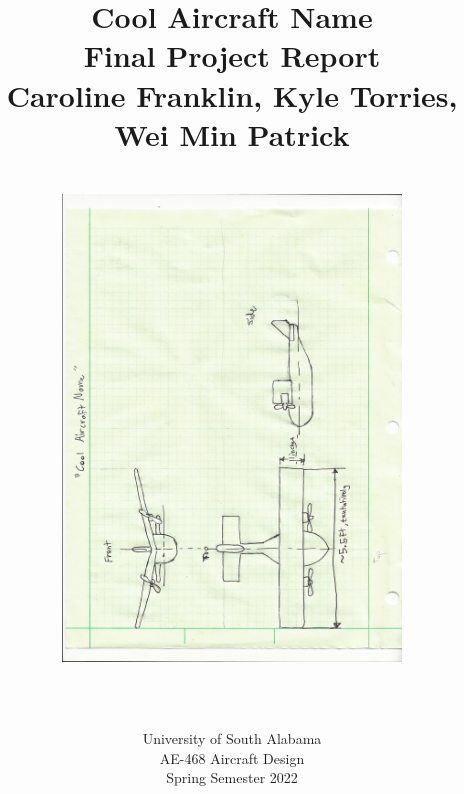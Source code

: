 \documentclass[footheight=20pt, footsepline, headheight=20pt, headsepline]{scrartcl}
\begin{document}
\title{
Cool Aircraft Name \\[1cm]
 \large{\textbf{Final Project Report} \\[1cm] Caroline Franklin, Kyle Torries, Wei Min Patrick}\\
 
 \begin{figure}[h]
 \centering
\includegraphics[width=9cm, height=13cm, angle=270]{cool aircraft name.jpeg}
\end{figure}} 

\date{\vfill \\University of South Alabama \\[0.5cm] AE-468 Aircraft Design \\[0.5cm] Spring Semester 2022}
\maketitle
\newpage
\tableofcontents
\newpage
\end{document}
